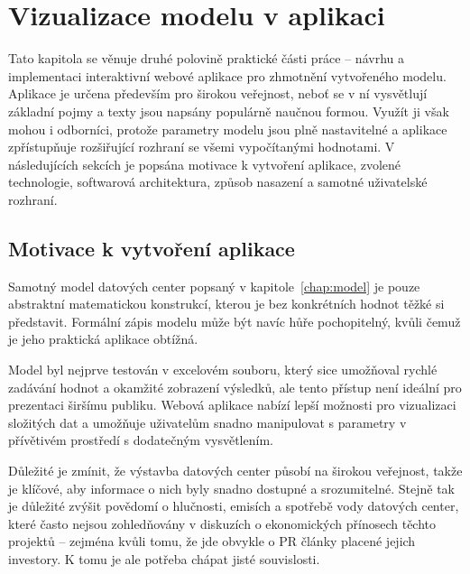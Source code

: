 \chapter{Vizualizace modelu v aplikaci}
\label{chap:app}

Tato kapitola se věnuje druhé polovině praktické části práce -- návrhu a implementaci interaktivní webové aplikace pro zhmotnění vytvořeného modelu. Aplikace je určena především pro širokou veřejnost, neboť se v ní vysvětlují základní pojmy a texty jsou napsány populárně naučnou formou. Využít ji však mohou i odborníci, protože parametry modelu jsou plně nastavitelné a aplikace zpřístupňuje rozšiřující rozhraní se všemi vypočítanými hodnotami. V následujících sekcích je popsána motivace k vytvoření aplikace, zvolené technologie, softwarová architektura, způsob nasazení a samotné uživatelské rozhraní.

\section{Motivace k vytvoření aplikace}
\label{sec:app_motivace}


Samotný model datových center popsaný v kapitole~\ref{chap:model} je pouze abstraktní matematickou konstrukcí, kterou je bez konkrétních hodnot těžké si představit. Formální zápis modelu může být navíc hůře pochopitelný, kvůli čemuž je jeho praktická aplikace obtížná.

Model byl nejprve testován v excelovém souboru, který sice umožňoval rychlé zadávání hodnot a okamžité zobrazení výsledků, ale tento přístup není ideální pro prezentaci širšímu publiku. Webová aplikace nabízí lepší možnosti pro vizualizaci složitých dat a umožňuje uživatelům snadno manipulovat s parametry v přívětivém prostředí s dodatečným vysvětlením.

Důležité je zmínit, že výstavba datových center působí na širokou veřejnost, takže je klíčové, aby informace o nich byly snadno dostupné a srozumitelné. Stejně tak je důležité zvýšit povědomí o hlučnosti, emisích a spotřebě vody datových center, které často nejsou zohledňovány v diskuzích o ekonomických přínosech těchto projektů -- zejména kvůli tomu, že jde obvykle o PR články placené jejich investory. K tomu je ale potřeba chápat jisté souvislosti.

